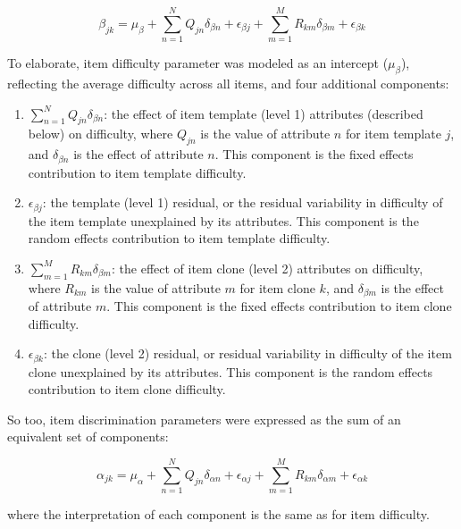\documentclass[a4paper,man,natbib]{apa6}
\begin{document}
\begin{equation}
\beta_{jk} = \mu_\beta + \sum_{n=1}^N Q_{jn} \delta_{\beta n} + \epsilon_{\beta j} + \sum_{m=1}^M R_{km} \delta_{\beta m} + \epsilon_{\beta k}
\end{equation}

\noindent To elaborate, item difficulty parameter was modeled as an intercept ($\mu_\beta$), reflecting the average difficulty across all items, and four additional components:

\begin{enumerate}

\item $\sum_{n=1}^N Q_{jn} \delta_{\beta n}$: the effect of item template (level 1) attributes (described below) on difficulty, where $Q_{jn}$ is the value of attribute $n$ for item template $j$, and $\delta_{\beta n}$ is the effect of attribute $n$. This component is the fixed effects contribution to item template difficulty.

\item $\epsilon_{\beta j}$: the template (level 1) residual, or the residual variability in difficulty of the item template unexplained by its attributes. This component is the random effects contribution to item template difficulty.

\item $\sum_{m=1}^M R_{km} \delta_{\beta m}$: the effect of item clone (level 2) attributes on difficulty, where $R_{km}$ is the value of attribute $m$ for item clone $k$, and $\delta_{\beta m}$ is the effect of attribute $m$. This component is the fixed effects contribution to item clone difficulty.

\item $\epsilon_{\beta k}$: the clone (level 2) residual, or residual variability in difficulty of the item clone unexplained by its attributes. This component is the random effects contribution to item clone difficulty.

\end{enumerate}

\noindent So too, item discrimination parameters were expressed as the sum of an equivalent set of components:

\begin{equation}
\alpha_{jk} = \mu_\alpha + \sum_{n=1}^N Q_{jn} \delta_{\alpha n} + \epsilon_{\alpha j} + \sum_{m=1}^M R_{km} \delta_{\alpha m} + \epsilon_{\alpha k}
\end{equation}

\noindent where the interpretation of each component is the same as for item difficulty.
\end{document}

